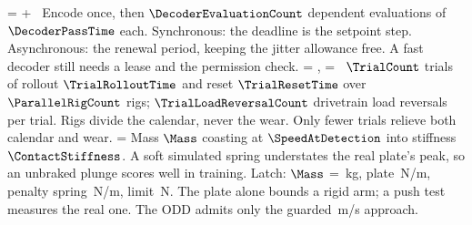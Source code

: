 \documentclass{studysheet}
\begin{document}
\begin{rightcol}
%
  {\ProposerInferenceTime = \ObservationEncodingTime + \DecoderEvaluationCount\,\DecoderPassTime \le \CompletionDeadline}%
  {Encode once, then $\DecoderEvaluationCount$ dependent evaluations of $\DecoderPassTime$ each. Synchronous: the deadline is
   the setpoint step. Asynchronous: the renewal period, keeping the jitter allowance free.}%
  {A fast decoder still needs a lease and the permission check.}{}
%
  {\TrialCampaignWallTime = \frac{\TrialCount\,(\TrialRolloutTime + \TrialResetTime)}{\ParallelRigCount},
   \qquad {} = \TrialCount\,\TrialLoadReversalCount}%
  {$\TrialCount$ trials of rollout $\TrialRolloutTime$ and reset $\TrialResetTime$ over $\ParallelRigCount$ rigs;
   $\TrialLoadReversalCount$ drivetrain load reversals per trial. Rigs divide the calendar, never the wear.}%
  {Only fewer trials relieve both calendar and wear.}{}
%
  {\UnbrakedImpactForce = \SpeedAtDetection\sqrt{\ContactStiffness\,\Mass}}%
  {Mass $\Mass$ coasting at $\SpeedAtDetection$ into stiffness $\ContactStiffness$. A soft simulated spring
   understates the real plate's peak, so an unbraked plunge scores well in training.}%
  {Latch: $\Mass$ = \,kg, plate \,N/m, penalty spring \,N/m, limit \,N.
   The plate alone bounds a rigid arm; a push test measures the real one. The ODD admits only the guarded \,m/s approach.}%
  {}
\end{rightcol}
\end{document}
